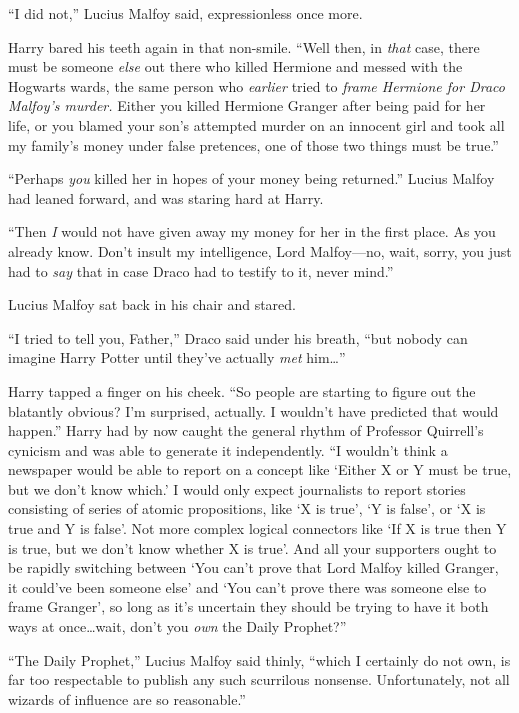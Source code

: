 “I did not,” Lucius Malfoy said, expressionless once more.

Harry bared his teeth again in that non-smile. “Well then, in \emph{that} case, there must be someone \emph{else} out there who killed Hermione and messed with the Hogwarts wards, the same person who \emph{earlier} tried to \emph{frame Hermione for Draco Malfoy’s murder.} Either you killed Hermione Granger after being paid for her life, or you blamed your son’s attempted murder on an innocent girl and took all my family’s money under false pretences, one of those two things must be true.”

“Perhaps \emph{you} killed her in hopes of your money being returned.” Lucius Malfoy had leaned forward, and was staring hard at Harry.

“Then \emph{I} would not have given away my money for her in the first place. As you already know. Don’t insult my intelligence, Lord Malfoy—no, wait, sorry, you just had to \emph{say} that in case Draco had to testify to it, never mind.”

Lucius Malfoy sat back in his chair and stared.

“I tried to tell you, Father,” Draco said under his breath, “but nobody can imagine Harry Potter until they’ve actually \emph{met} him…”

Harry tapped a finger on his cheek. “So people are starting to figure out the blatantly obvious? I’m surprised, actually. I wouldn’t have predicted that would happen.” Harry had by now caught the general rhythm of Professor Quirrell’s cynicism and was able to generate it independently. “I wouldn’t think a newspaper would be able to report on a concept like ‘Either X or Y must be true, but we don’t know which.’ I would only expect journalists to report stories consisting of series of atomic propositions, like ‘X is true’, ‘Y is false’, or ‘X is true and Y is false’. Not more complex logical connectors like ‘If X is true then Y is true, but we don’t know whether X is true’. And all your supporters ought to be rapidly switching between ‘You can’t prove that Lord Malfoy killed Granger, it could’ve been someone else’ and ‘You can’t prove there was someone else to frame Granger’, so long as it’s uncertain they should be trying to have it both ways at once…wait, don’t you \emph{own} the Daily Prophet?”

“The Daily Prophet,” Lucius Malfoy said thinly, “which I certainly do not own, is far too respectable to publish any such scurrilous nonsense. Unfortunately, not all wizards of influence are so reasonable.”

